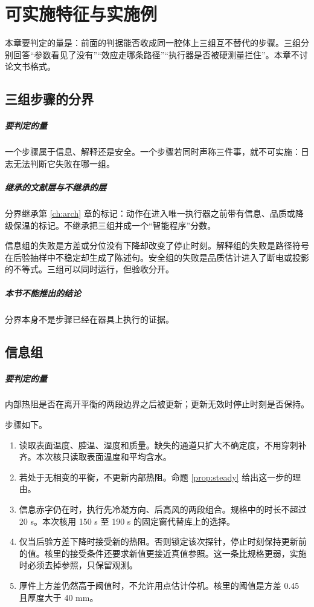 \chapter{可实施特征与实施例}
\label{ch:patent}

本章要判定的量是：前面的判据能否收成同一腔体上三组互不替代的步骤。三组分别回答“参数看见了没有”“效应走哪条路径”“执行器是否被硬测量拦住”。本章不讨论文书格式。

\section{三组步骤的分界}

\paragraph{要判定的量}
一个步骤属于信息、解释还是安全。一个步骤若同时声称三件事，就不可实施：日志无法判断它失败在哪一组。

\paragraph{继承的文献层与不继承的层}
分界继承第 \ref{ch:arch} 章的标记：动作在进入唯一执行器之前带有信息、品质或降级保温的标记。不继承把三组并成一个“智能程序”分数。

信息组的失败是方差或分位没有下降却改变了停止时刻。解释组的失败是路径符号在后验抽样中不稳定却生成了陈述句。安全组的失败是品质估计进入了断电或投影的不等式。三组可以同时运行，但验收分开。

\paragraph{本节不能推出的结论}
分界本身不是步骤已经在器具上执行的证据。

\section{信息组}

\paragraph{要判定的量}
内部热阻是否在离开平衡的两段边界之后被更新；更新无效时停止时刻是否保持。

步骤如下。

\begin{enumerate}
\item 读取表面温度、腔温、湿度和质量。缺失的通道只扩大不确定度，不用穿刺补齐。本次核只读取表面温度和平均含水。
\item 若处于无相变的平衡，不更新内部热阻。命题 \ref{prop:steady} 给出这一步的理由。
\item 信息赤字仍在时，执行先冷凝方向、后高风的两段组合。规格中的时长不超过 20 s。本次核用 150 s 至 190 s 的固定窗代替库上的选择。
\item 仅当后验方差下降时接受新的热阻。否则锁定该次探针，停止时刻保持更新前的值。核里的接受条件还要求新值更接近真值参照。这一条比规格更弱，实施时必须去掉参照，只保留观测。
\item 厚件上方差仍然高于阈值时，不允许用点估计停机。核里的阈值是方差 0.45 且厚度大于 40 mm。
\end{enumerate}

